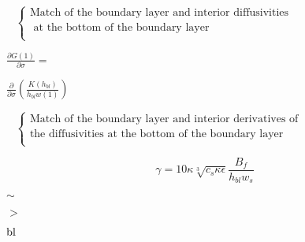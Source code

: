 {\newpage\clearpage
{}%
$\displaystyle \;\;\;
\left\{
\begin{array}{l}
\mbox{Match of the boundary layer and
interior diffusivities} \\
\mbox{ at the bottom of the boundary layer}\\
\end{array}
\right.$%
\lthtmlindisplaymathZ
\lthtmlcheckvsize\clearpage}

{\newpage\clearpage
{}%
$\displaystyle \frac{\partial G(1)}{\partial \sigma}  =$%
\lthtmlindisplaymathZ
\lthtmlcheckvsize\clearpage}

{\newpage\clearpage
{}%
$\textstyle \frac{\partial}{\partial \sigma}
\left( \frac{K(h_{bl})}{h_{bl}w(1)} \right)$%
\lthtmlindisplaymathZ
\lthtmlcheckvsize\clearpage}

{\newpage\clearpage
{}%
$\displaystyle \;\;\;
\left\{
\begin{array}{l}
\mbox{Match of the boundary layer and interior derivatives of} \\
\mbox{the diffusivities at the bottom of the boundary layer}\\
\end{array}
\right.$%
\lthtmlindisplaymathZ
\lthtmlcheckvsize\clearpage}

{\newpage\clearpage
{}%
\begin{displaymath}
\gamma = 10 \kappa  \sqrt[3]{c_s\kappa\epsilon} 
\frac{B_f}{h_{bl}w_s}
\end{displaymath}%
\lthtmldisplayZ
\lthtmlcheckvsize\clearpage}

{\newpage\clearpage
{}%
$\sim$%
\lthtmlinlinemathZ
\lthtmlcheckvsize\clearpage}

{\newpage\clearpage
{}%
$>$%
\lthtmlinlinemathZ
\lthtmlcheckvsize\clearpage}

{\newpage\clearpage
{}%
$_{\hbox{bl}}$%
\lthtmlinlinemathZ
\lthtmlcheckvsize\clearpage}



